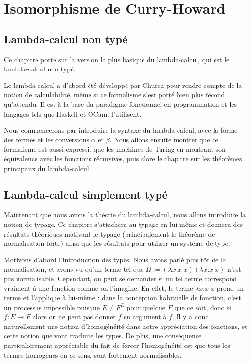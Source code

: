 \part{Isomorphisme de Curry-Howard}

\chapter{Lambda-calcul non typé}

Ce chapitre porte sur la version la plus basique du lambda-calcul, qui est le lambda-calcul non typé.

Le lambda-calcul a d'abord été développé par Church pour rendre compte de la notion de calculabilité, même si ce formalisme s'est porté bien plus fécond qu'attendu. Il est à la base du paradigme fonctionnel en programmation et les langages tels que Haskell et OCaml l'utilisent.

Nous commencerons par introduire la syntaxe du lambda-calcul, avec la forme des termes et les conversions $\alpha$ et $\beta$. Nous allons ensuite montrer que ce formalisme est aussi expressif que les machines de Turing en montrant son équivalence avec les fonctions récursives, puis clore le chapitre sur les théorèmes principaux du lambda-calcul.







\chapter{Lambda-calcul simplement typé}

Maintenant que nous avons la théorie du lambda-calcul, nous allons introduire la notion de typage. Ce chapitre s'attachera au typage en lui-même et donnera des résultats théoriques motivant le typage (principalement le théorème de normalisation forte) ainsi que les résultats pour utiliser un système de type.

Motivons d'abord l'introduction des types. Nous avons parlé plus tôt de la normalisation, et avons vu qu'un terme tel que $\Omega := (\lambda x.x\;x)(\lambda x.x\;x)$ n'est pas normalisable. Cependant, on peut se demander si un tel terme correspond vraiment à une fonction comme on l'imagine. En effet, le terme $\lambda x.x\;x$ prend un terme et l'applique à lui-même : dans la conception habituelle de fonction, c'est un processus impossible puisque $E \neq F^E$ pour quelque $F$ que ce soit, donc si $f : E \to F$ alors on ne peut pas donner $f$ en argument à $f$. Il y a donc naturellement une notion d'homogénéité dans notre appréciation des fonctions, et cette notion que vont traduire les types. De plus, une conséquence particulièrement appréciable du fait de forcer l'homogénéité est que tous les termes homogènes en ce sens, sont fortement normalisables.

